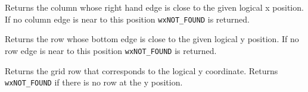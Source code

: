 
Returns the column whose right hand edge is close to the given logical x position.
If no column edge is near to this position {\tt wxNOT\_FOUND} is returned.



\label{wxgridytoedgeofrow}


Returns the row whose bottom edge is close to the given logical y position.
If no row edge is near to this position {\tt wxNOT\_FOUND} is returned.



\label{wxgridytorow}


Returns the grid row that corresponds to the logical y coordinate. Returns
{\tt wxNOT\_FOUND} if there is no row at the y position.

